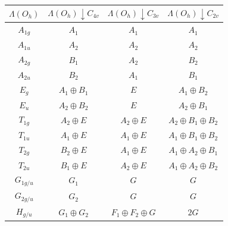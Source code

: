     \begin{table}
        \centering
        \begin{tabular}{c|c|c|c}
            $\Lambda(O_h)$ & $\Lambda(O_h)\downarrow C_{4v}$ & $\Lambda(O_h) \downarrow C_
            {3v}$ & $\Lambda(O_h) \downarrow C_{2v}$ \\
            \hline
            $A_{1g}$ & $A_1$ & $A_1$ & $A_1$ \\
            $A_{1u}$ & $A_2$ & $A_2$ & $A_2$ \\
            $A_{2g}$ & $B_1$ & $A_2$ & $B_2$ \\
            $A_{2u}$ & $B_2$ & $A_1$ & $B_1$ \\
            $E_g$ & $A_1 \oplus B_1$ & $E$ & $A_1 \oplus B_2$ \\
            $E_u$ & $A_2 \oplus B_2$ & $E$ & $A_2 \oplus B_1$ \\
            $T_{1g}$ & $A_2 \oplus E$ & $A_2 \oplus E$ & $A_2 \oplus B_1 \oplus B_2$ \\
            $T_{1u}$ & $A_1 \oplus E$ & $A_1 \oplus E$ & $A_1 \oplus B_1 \oplus B_2$ \\
            $T_{2g}$ & $B_2 \oplus E$ & $A_1 \oplus E$ & $A_1 \oplus A_2 \oplus B_1$ \\
            $T_{2u}$ & $B_1 \oplus E$ & $A_2 \oplus E$ & $A_1 \oplus A_2 \oplus B_2$ \\
            $G_{1g/u}$ & $G_1$ & $G$ & $G$ \\
            $G_{2g/u}$ & $G_2$ & $G$ & $G$ \\
            $H_{g/u}$ & $G_1 \oplus G_2$ & $F_1 \oplus F_2 \oplus G$ & $2G$
        \end{tabular}
        \caption{}
        \label{table:subductions}
    \end{table}
    
